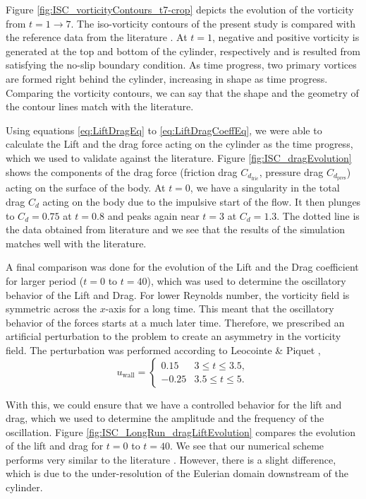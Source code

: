 Figure \ref{fig:ISC_vorticityContours_t7-crop} depicts the evolution of the vorticity from $t=1\rightarrow7$. The iso-vorticity contours of the present study is compared with the reference data from the literature \cite{Koumoutsakos1995a}. At $t=1$, negative and positive vorticity is generated at the top and bottom of the cylinder, respectively and is resulted from satisfying the no-slip boundary condition. As time progress, two primary vortices are formed right behind the cylinder, increasing in shape as time progress. Comparing the vorticity contours, we can say that the shape and the geometry of the contour lines match with the literature. 

Using equations \ref{eq:LiftDragEq} to \ref{eq:LiftDragCoeffEq}, we were able to calculate the Lift and the drag force acting on the cylinder as the time progress, which we used to validate against the literature. Figure \ref{fig:ISC_dragEvolution} shows the components of the drag force (friction drag $C_{d_{\mathrm{fric}}}$, pressure drag $C_{d_{\mathrm{pres}}}$) acting on the surface of the body. At $t=0$, we have a singularity in the total drag $C_d$ acting on the body due to the impulsive start of the flow. It then plunges to $C_d=0.75$ at $t=0.8$ and peaks again near $t=3$ at $C_d=1.3$. The dotted line is the data obtained from literature \cite{Koumoutsakos1995a} and we see that the results of the simulation matches well with the literature.

A final comparison was done for the evolution of the Lift and the Drag coefficient for larger period ($t=0$ to $t=40$), which was used to determine the oscillatory behavior of the Lift and Drag. For lower Reynolds number, the vorticity field is symmetric across the $x$-axis for a long time. This meant that the oscillatory behavior of the forces starts at a much later time. Therefore, we prescribed an artificial perturbation to the problem to create an asymmetry in the vorticity field. The perturbation was performed according to Leocointe \& Piquet \cite{Lecointe1984},
	\begin{equation}
	 u_{\mathrm{wall}} = \begin{cases}
	 0.15 & 3 \leqslant t \leqslant 3.5, \\
	 -0.25 & 3.5 \leqslant t \leqslant 5.
	 \end{cases}
	\label{eq:perturbation}
	\end{equation}
	
With this, we could ensure that we have a controlled behavior for the lift and drag, which we used to determine the amplitude and the frequency of the oscillation. Figure \ref{fig:ISC_LongRun_dragLiftEvolution} compares the evolution of the lift and drag for $t=0$ to $t=40$. We see that our numerical scheme performs very similar to the literature \cite{MosheRosenFeldDochanKwak1991}. However, there is a slight difference, which is due to the under-resolution of the Eulerian domain downstream of the cylinder.

